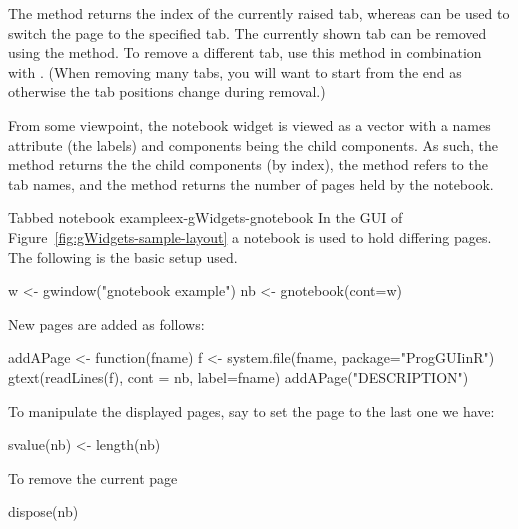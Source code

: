 The  method returns the index of the
currently raised tab, whereas  can be
used to switch the page to the specified tab. The currently shown tab
can be removed using the  method. To remove
a different tab, use this method in combination with
. (When removing many tabs, you will want to start
from the end as otherwise the tab positions change during removal.)

From some viewpoint, the notebook widget is viewed as a vector with a
names attribute (the labels) and components being the child
components. As such, the \meth{[} method returns the the child
components (by index), the  method refers to
the tab names, and the  method returns the
number of pages held by the notebook.



\begin{example}{Tabbed notebook example}{ex-gWidgets-gnotebook}
 In the GUI of Figure~\ref{fig:gWidgets-sample-layout} a notebook is
 used to hold differing pages. The following is the basic setup used.
\begin{Schunk}
\begin{Sinput}
 w <- gwindow("gnotebook example")
 nb <- gnotebook(cont=w)
\end{Sinput}
\end{Schunk}

New pages are added as follows:
\begin{Schunk}
\begin{Sinput}
 addAPage <- function(fname) {
   f <- system.file(fname, package="ProgGUIinR")
   gtext(readLines(f), cont = nb, label=fname)
 }
 addAPage("DESCRIPTION")
\end{Sinput}
\end{Schunk}

To manipulate the displayed pages, say to set the page to the last one
we have:
\begin{Schunk}
\begin{Sinput}
 svalue(nb) <- length(nb)
\end{Sinput}
\end{Schunk}
%
To remove the current page
\begin{Schunk}
\begin{Sinput}
 dispose(nb)
\end{Sinput}
\end{Schunk}
%
\end{example}






